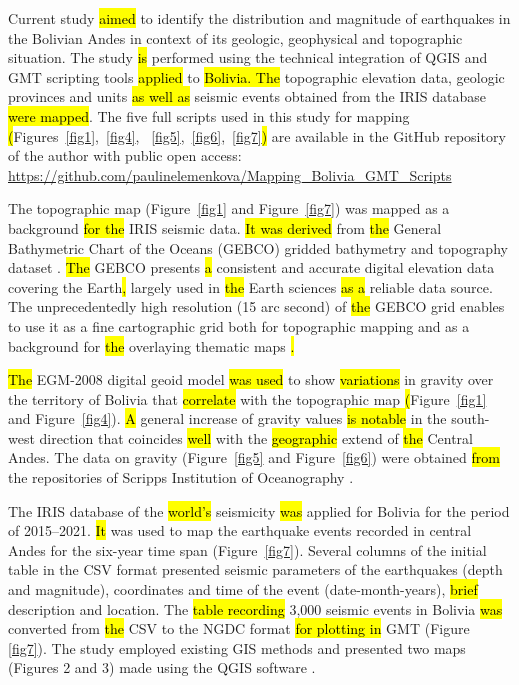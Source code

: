 \documentclass[data,article,submit,pdftex,moreauthors]{Definitions/mdpi}
\begin{document}
Current study \hl{aimed} to identify the distribution and magnitude of earthquakes in the Bolivian Andes in context of its geologic, geophysical and topographic situation. The study \hl{is} performed using the technical integration of QGIS and GMT scripting tools \hl{applied} to \hl{Bolivia. The} topographic elevation data, geologic provinces and units \hl{as well as} seismic events obtained from the IRIS database \hl{were mapped}. The five full scripts used in this study for mapping \hl{(}Figures~\ref{fig1},~\ref{fig4}, ~\ref{fig5},~\ref{fig6},~\ref{fig7}\hl{)} are available in the GitHub repository of the author with public open access: \href{https://github.com/paulinelemenkova/Mapping_Bolivia_GMT_Scripts}{https://github.com/paulinelemenkova/Mapping\_Bolivia\_GMT\_Scripts}	 

The topographic map (Figure~\ref{fig1} and Figure~\ref{fig7}) was mapped as a background \hl{for the} IRIS seismic data. \hl{It was derived} from \hl{the} General Bathymetric Chart of the Oceans (GEBCO) gridded bathymetry and topography dataset \cite{Schenke2016}. \hl{The} GEBCO presents \hl{a} consistent and accurate digital elevation data covering the Earth\hl{,} largely used in \hl{the} Earth sciences \hl{as a} reliable data source. The unprecedentedly high resolution (15 arc second) of \hl{the} GEBCO grid enables to use it as a fine cartographic grid both for topographic mapping and as a background for \hl{the} overlaying thematic maps \cite{Lemenkova2020b}\hl{.} 

\hl{The} EGM-2008 \cite{Pavlis} digital geoid model \hl{was used} to show \hl{variations} in gravity over the territory of Bolivia that \hl{correlate} with the topographic map \hl{(}Figure~\ref{fig1} and Figure~\ref{fig4}). \hl{A} general increase of gravity values \hl{is notable} in the south-west direction that coincides \hl{well} with the \hl{geographic} extend of \hl{the} Central Andes. The data on\hl{ }gravity (Figure~\ref{fig5} and Figure~\ref{fig6}) were obtained \hl{from} the repositories of Scripps Institution of Oceanography \cite{Sandwelletal2014}. 

The IRIS database of the \hl{world's} seismicity \hl{was} applied for Bolivia for the period of 2015–2021. \hl{It} was used to map the earthquake events recorded in central Andes for the six-year time span (Figure~\ref{fig7}). Several columns of the initial table in the CSV format presented seismic parameters of the earthquakes (depth and magnitude), coordinates and time of the event (date-month-years), \hl{brief} description and location. The \hl{table recording} 3,000 seismic events in Bolivia \hl{was} converted from \hl{the} CSV to the NGDC format \hl{for plotting in} GMT (Figure \ref{fig7}). The study employed existing GIS methods \cite{Hubbard,Lemenkova202135,Suetova,Lemenkova202125,Klauco2013,Klauco2017} and presented two maps (Figures 2 and 3) made using the QGIS software \cite{QGIS}.
\end{document}
